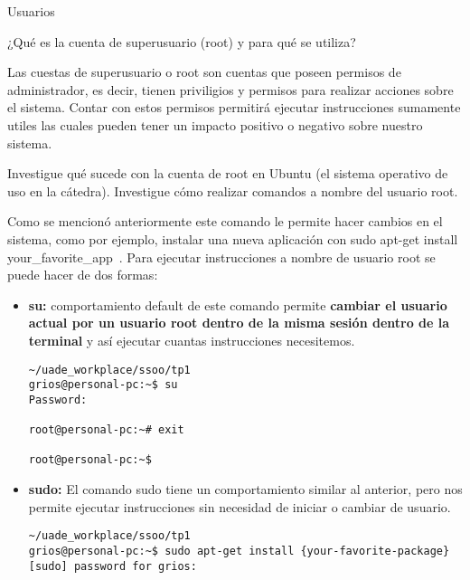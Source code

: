 \begin{section}{Usuarios}

\begin{quoting}
¿Qué es la cuenta de superusuario (root) y para qué se utiliza?
\end{quoting}

Las cuestas de superusuario o root son cuentas que poseen permisos de administrador, es decir, tienen priviligios y permisos para realizar acciones sobre el sistema. Contar con estos permisos permitirá ejecutar instrucciones sumamente utiles las cuales pueden tener un impacto positivo o negativo sobre nuestro sistema.

\hfill

\begin{quoting}
Investigue qué sucede con la cuenta de root en Ubuntu (el sistema operativo de uso en la cátedra). Investigue cómo realizar comandos a nombre del usuario root.
\end{quoting}

Como se mencionó anteriormente este comando le permite hacer cambios en el sistema, como por ejemplo, instalar una nueva aplicación con \guillemotleft sudo apt-get install your\_favorite\_app\ \guillemotright. Para ejecutar instrucciones a nombre de usuario root se puede hacer de dos formas:

\begin{itemize}

\item \textbf{su:}
comportamiento default de este comando permite \textbf{cambiar el usuario actual por un usuario root dentro de la misma sesión dentro de la terminal} y así ejecutar cuantas instrucciones necesitemos.

\begin{lstlisting}[style=Ubuntu]
~/uade_workplace/ssoo/tp1
grios@personal-pc:~$ su
Password: 

root@personal-pc:~# exit

root@personal-pc:~$ 
\end{lstlisting}

\item \textbf{sudo:}
El comando sudo tiene un comportamiento similar al anterior, pero nos permite ejecutar instrucciones sin necesidad de iniciar o cambiar de usuario.

\begin{lstlisting}[style=Ubuntu]
~/uade_workplace/ssoo/tp1
grios@personal-pc:~$ sudo apt-get install {your-favorite-package}        
[sudo] password for grios: 
\end{lstlisting}


\end{itemize}
\end{section}
